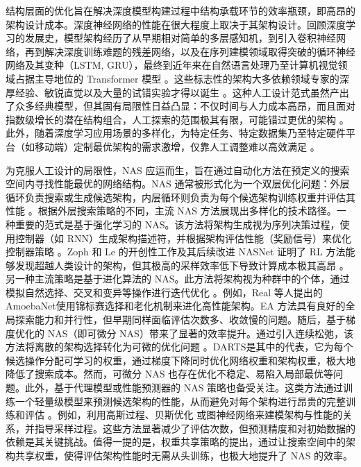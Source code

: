 \documentclass[../main.tex]{subfiles}
\begin{document}
\label{sec:ch1-2-2-structural-transfer-status-limitations}

结构层面的优化旨在解决深度模型构建过程中结构承载环节的效率瓶颈，即高昂的架构设计成本。深度神经网络的性能在很大程度上取决于其架构设计。回顾深度学习的发展史，模型架构经历了从早期相对简单的多层感知机，到引入卷积神经网络，再到解决深度训练难题的残差网络，以及在序列建模领域取得突破的循环神经网络及其变种（LSTM, GRU），最终到近年来在自然语言处理乃至计算机视觉领域占据主导地位的 Transformer 模型 。这些标志性的架构大多依赖领域专家的深厚经验、敏锐直觉以及大量的试错实验才得以诞生 。这种人工设计范式虽然产出了众多经典模型，但其固有局限性日益凸显：不仅时间与人力成本高昂，而且面对指数级增长的潜在结构组合，人工探索的范围极其有限，可能错过更优的架构 。此外，随着深度学习应用场景的多样化，为特定任务、特定数据集乃至特定硬件平台（如移动端）定制最优架构的需求激增，仅靠人工调整难以高效满足 。

为克服人工设计的局限性，NAS 应运而生，旨在通过自动化方法在预定义的搜索空间内寻找性能最优的网络结构\cite{neuralarchitecturesearch_zoph_2017,neuralarchitecturesearch_elsken_2019}。NAS 通常被形式化为一个双层优化问题：外层循环负责搜索或生成候选架构，内层循环则负责为每个候选架构训练权重并评估其性能 。根据外层搜索策略的不同，主流 NAS 方法展现出多样化的技术路径。一种重要的范式是基于强化学习的 NAS\cite{neuralarchitecturesearch_zoph_2017,learningtransferablearchitectures_zoph_2018}。该方法将架构生成视为序列决策过程，使用控制器（如 RNN）生成架构描述符，并根据架构评估性能（奖励信号）来优化控制器策略 。Zoph 和 Le 的开创性工作\cite{neuralarchitecturesearch_zoph_2017}及其后续改进 NASNet 证明了 RL 方法能够发现超越人类设计的架构，但其极高的采样效率低下导致计算成本极其高昂 。另一种主流策略是基于进化算法的 NAS\cite{regularizedevolutionimage_real_2019,efficienttwostage_hou_2021,cellbasedfast_dong_2023}。此方法将架构视为种群中的个体，通过模拟自然选择、交叉和变异等操作进行迭代优化 。例如，Real 等人提出的 AmoebaNet\cite{regularizedevolutionimage_real_2019}使用锦标赛选择和老化机制来进化高性能架构。EA 方法具有良好的全局探索能力和并行性，但早期同样面临评估次数多、收敛慢的问题\cite{surveyevolutionaryneural_liu_2020}。随后，基于梯度优化的 NAS（即可微分 NAS）带来了显著的效率提升\cite{dartsdifferentiablearchitecture_liu_2019,pcdartspartial_xu_2020}。通过引入连续松弛，该方法将离散的架构选择转化为可微的优化问题 。DARTS\cite{dartsdifferentiablearchitecture_liu_2019}是其中的代表，它为每个候选操作分配可学习的权重，通过梯度下降同时优化网络权重和架构权重，极大地降低了搜索成本。然而，可微分 NAS 也存在优化不稳定、易陷入局部最优等问题\cite{neuralarchitecturesearch_elsken_2019}。此外，基于代理模型或性能预测器的 NAS 策略也备受关注\cite{renasrelativisticevaluation_xu_2021,peepholepredictingnetwork_deng_2017}。这类方法通过训练一个轻量级模型来预测候选架构的性能，从而避免对每个架构进行昂贵的完整训练和评估 。例如，利用高斯过程、贝斯优化 或图神经网络\cite{practicalbayesianoptimization_snoek_2012,bananasbayesianoptimization_white_2021,archgraphacyclic_huang_2022}来建模架构与性能的关系，并指导采样过程。这些方法显著减少了评估次数，但预测精度和对初始数据的依赖是其关键挑战。值得一提的是，权重共享策略\cite{efficientneuralarchitecture_pham_2018,singlepathone_guo_2020}的提出，通过让搜索空间中的架构共享权重，使得评估架构性能时无需从头训练，也极大地提升了 NAS 的效率。
\end{document}

